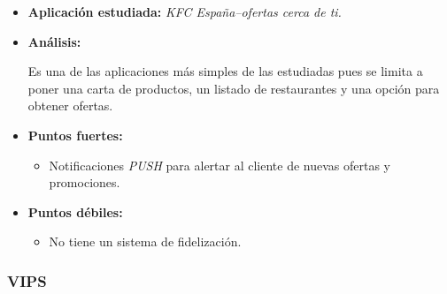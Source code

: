 \documentclass[twoside]{report}
\begin{document}
\begin{itemize}
\item \textbf{Aplicación estudiada:} \cite{kfcapp} \textit{KFC España–ofertas cerca de ti.}
\item \textbf{Análisis:} 

Es una de las aplicaciones más simples de las estudiadas pues se limita a poner una carta de productos, un listado de restaurantes y una opción para obtener ofertas.

\item \textbf{Puntos fuertes:}
	\begin{itemize}
	\item Notificaciones \textit{PUSH} para alertar al cliente de nuevas ofertas y promociones.
	\end{itemize}
\item \textbf{Puntos débiles:}
	\begin{itemize}
	\item No tiene un sistema de fidelización.
	\end{itemize}
\end{itemize}

\subsubsection{VIPS}
\end{document}
